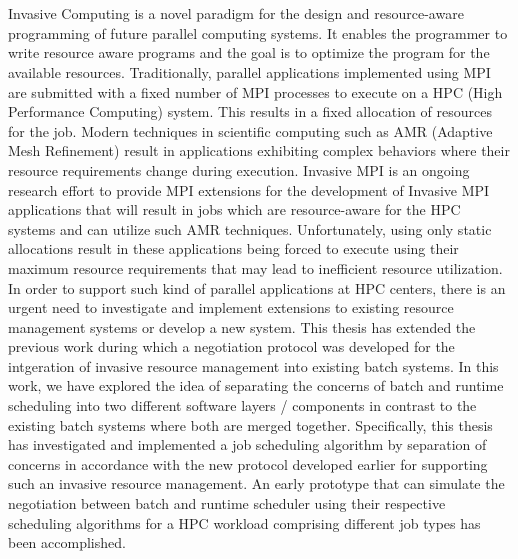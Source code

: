 \chapter{\abstractname}
Invasive Computing is a novel paradigm for the design and resource-aware programming of future parallel computing systems. It enables the programmer to write resource aware programs and the goal is to optimize the program for the available resources. Traditionally, parallel applications implemented using MPI are submitted with a fixed number of MPI processes to execute on a HPC (High Performance Computing) system. This results in a fixed allocation of resources for the job. Modern techniques in scientific computing such as AMR (Adaptive Mesh Refinement) result in applications exhibiting complex behaviors where their resource requirements change during execution. Invasive MPI is an ongoing research effort to provide MPI extensions for the development of Invasive MPI applications that will result in jobs which are resource-aware for the HPC systems and can utilize such AMR techniques. Unfortunately, using only static allocations result in these applications being forced to execute using their maximum resource requirements that may lead to inefficient resource utilization. In order to support such kind of parallel applications at HPC centers, there is an urgent need to investigate and implement extensions to existing resource management systems or develop a new system. This thesis has extended the previous work during which a negotiation protocol was developed for the intgeration of invasive resource management into existing batch systems. In this work, we have explored the idea of separating the concerns of batch and runtime scheduling into two different software layers / components in contrast to the existing batch systems where both are merged together. Specifically, this thesis has investigated and implemented a job scheduling algorithm by separation of concerns in accordance with the new protocol developed earlier for supporting such an invasive resource management. An early prototype that can simulate the negotiation between batch and runtime scheduler using their respective scheduling algorithms for a HPC workload comprising different job types has been accomplished.\par



